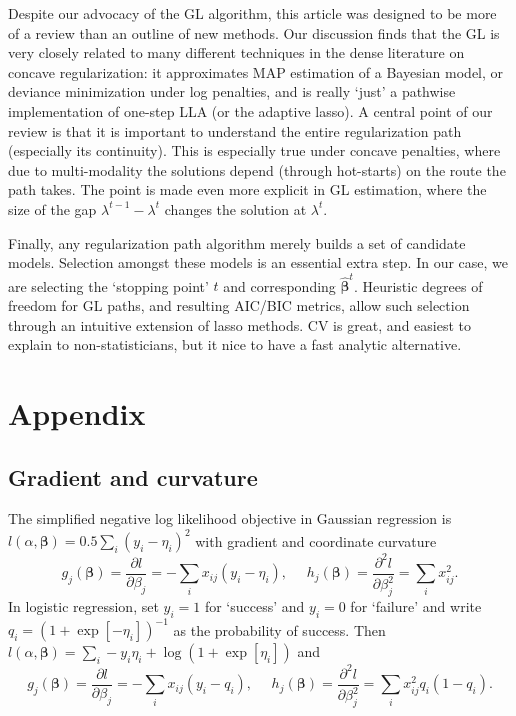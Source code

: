 \documentclass[12pt]{article}
\newcommand{\bs}[1]{\boldsymbol{#1}}
\begin{document}
Despite our advocacy of the GL algorithm, this article was designed to be more of a review than an outline of new methods.  Our discussion finds that
the GL is very closely related to many different techniques in the dense
literature on concave regularization: it approximates MAP estimation of a
Bayesian model, or deviance minimization under log penalties, and is really
`just' a pathwise implementation of one-step LLA (or the adaptive lasso). A
central point of our review is that it is important to understand 
the entire regularization path (especially its continuity). This is especially
true under concave penalties, where due to multi-modality the solutions depend
(through hot-starts) on the route the path takes.  The point is made even
more explicit in GL estimation, where the size of the gap $\lambda^{t-1} -
\lambda^{t}$ changes the solution at $\lambda^t$.

Finally, any regularization path algorithm merely builds a set of candidate
models. Selection amongst these models is an essential extra step.  In our
case, we are selecting the `stopping point' $t$ and corresponding
$\bs{\hat\beta}^t$. Heuristic degrees of freedom for GL paths, and
resulting AIC/BIC metrics,  allow such selection through an intuitive
extension of lasso methods. CV is great, and easiest to
explain to non-statisticians, but it nice to have a fast analytic alternative.


\appendix

\section{Appendix}

\subsection{Gradient and curvature}
\label{models}

The
simplified negative log likelihood objective in Gaussian regression is $
l(\alpha,\bs{\beta}) = 0.5\sum_i (y_i -\eta_i)^2 $ with gradient
and coordinate curvature
\[
g_j(\bs{\beta}) = \frac{\partial l}{\partial \beta_j} = -\sum_i
x_{ij}(y_i - \eta_i),~~~~~~
h_j(\bs{\beta}) = \frac{\partial^2 l}{\partial \beta_j^2} = \sum_i
x_{ij}^2.
\]
In logistic regression, set $y_i = 1$ for `success' and $y_i = 0$ for
`failure' and write $q_i = (1 + \exp[-\eta_i])^{-1}$ as the
probability of success.  Then
$l(\alpha,\bs{\beta}) = \sum_i -y_i\eta_i + \log(1 +
  \exp[\eta_i])$ and
\[
g_j(\bs{\beta}) = \frac{\partial l}{\partial \beta_j} = -\sum_i
x_{ij}(y_i - q_i),~~~~~~
h_j(\bs{\beta}) = \frac{\partial^2 l}{\partial \beta_j^2} = \sum_i
x_{ij}^2q_i(1-q_i).
\]
\end{document}
